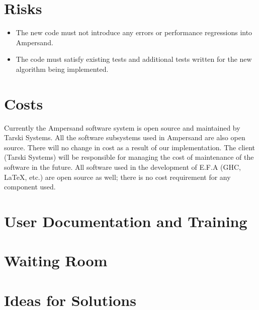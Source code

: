 \documentclass[12pt]{report}
\begin{document}
\section{Risks}\label{sec:Risks}
\begin{itemize}
\item The new code must not introduce any 
errors or performance regressions
into Ampersand.
\item The code must satisfy existing tests and 
additional tests written for the new algorithm being implemented.
\end{itemize}

\section{Costs}\label{sec:Costs}
Currently the Ampersand software system is open source and maintained by Tarski
Systems.  All the software subsystems used in Ampersand are also open
source. There will no change in cost as a result of our implementation. The
client (Tarski Systems) will be responsible for managing the cost of
maintenance of the software in the future. All software used in the development
of E.F.A (GHC, LaTeX, etc.) are open source as well; there is no cost
requirement for any component used.
\section{User Documentation and Training}\label{sec:UserDoc}
\section{Waiting Room}\label{sec:Waiting}
\section{Ideas for Solutions}\label{sec:Solutions}




\end{document}
